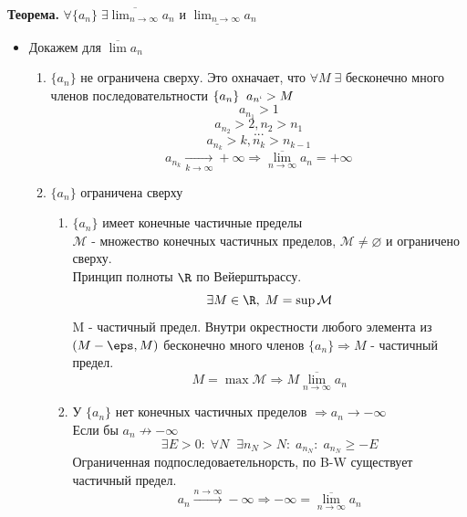 \textbf{Теорема.} $\forall \{a_n\} \; \exists \overline{\lim_{n\to\infty}} a_n$ и $\underline{\lim_{n\to\infty}} a_n$
\begin{tcolorbox}[title=Доказательство]
	\begin{itemize}
		\item Докажем для $\overline{\lim} a_n$
			\begin{enumerate}
				\item $\{a_n\}$ не ограничена сверху. Это охначает, что $\forall M \; \exists$ бесконечно много членов последовательтности $\{a_n\} \;\; a_{n`} > M$
					\[ a_{n_1} > 1\]
					\[ a_{n_2} > 2, n_2 > n_1\]
					\[ ... \]
					\[ a_{n_k} > k, n_k > n_{k - 1}\]
					\[ a_{n_k} \xrightarrow[k\to\infty]{} +\infty \Rightarrow \overline{\lim_{n\to\infty}} a_n = +\infty \]
				\item $\{a_n\}$ ограничена сверху
					\begin{enumerate}
						\item $\{a_n\}$ имеет конечные частичные пределы\\
							$\mathcal{M}$ - множество конечных частичных пределов, $\mathcal{M} \not= \varnothing$ и ограничено сверху. \\
							Принцип полноты $\R$ по Вейерштьрассу. 
							\[ \exists M \in \R,\; M = \sup \mathcal{M} \]
							M - частичный предел. Внутри окрестности любого элемента из $(M - \eps, M)$ бесконечно много членов $\{a_n\} \Rightarrow M$ - частичный предел. 
							\[ M = \max \mathcal{M}  \Rightarrow M \overline{\lim_{n\to\infty}} a_n \]
						\item У $\{ a_n \}$ нет конечных частичных пределов $\Rightarrow a_n \to -\infty$\\
							Если бы $a_n \not\to -\infty$
							\[ \exists E > 0: \;\forall N \;\; \exists n_N > N:\; a_{n_N}:\; a_{n_N} \geq -E \]
							Ограниченная подпоследоваетельнорсть, по B-W существует частичный предел.
							\[ a_n \xrightarrow[]{n \to \infty} -\infty \Rightarrow -\infty = \overline{\lim_{n\to\infty}} a_n \]
					\end{enumerate}
			\end{enumerate}
	\end{itemize}
\end{tcolorbox}
